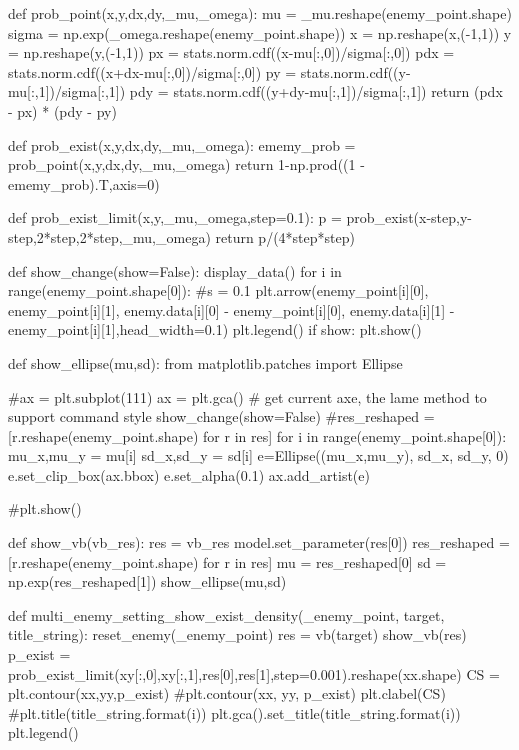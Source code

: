 \documentclass{article}
\begin{document}
\begin{python}

def prob_point(x,y,dx,dy,_mu,_omega):
    mu = _mu.reshape(enemy_point.shape)
    sigma = np.exp(_omega.reshape(enemy_point.shape))
    x = np.reshape(x,(-1,1))
    y = np.reshape(y,(-1,1))
    px  = stats.norm.cdf((x-mu[:,0])/sigma[:,0])
    pdx = stats.norm.cdf((x+dx-mu[:,0])/sigma[:,0])
    py  = stats.norm.cdf((y-mu[:,1])/sigma[:,1])
    pdy = stats.norm.cdf((y+dy-mu[:,1])/sigma[:,1])
    return (pdx - px) * (pdy - py)

def prob_exist(x,y,dx,dy,_mu,_omega):
    ememy_prob = prob_point(x,y,dx,dy,_mu,_omega)
    return 1-np.prod((1 - ememy_prob).T,axis=0) 

def prob_exist_limit(x,y,_mu,_omega,step=0.1):
    p = prob_exist(x-step,y-step,2*step,2*step,_mu,_omega)
    return p/(4*step*step)

def show_change(show=False):
    display_data()
    for i in range(enemy_point.shape[0]):
        #s = 0.1
        plt.arrow(enemy_point[i][0], enemy_point[i][1], enemy.data[i][0] - enemy_point[i][0], enemy.data[i][1] - enemy_point[i][1],head_width=0.1)
    plt.legend()
    if show:
        plt.show()


def show_ellipse(mu,sd):
    from matplotlib.patches import Ellipse
    
    #ax = plt.subplot(111)
    ax = plt.gca() # get current axe, the lame method to support command style
    show_change(show=False)
    #res_reshaped = [r.reshape(enemy_point.shape) for r in res]
    for i in range(enemy_point.shape[0]):
        mu_x,mu_y = mu[i]
        sd_x,sd_y = sd[i]
        e=Ellipse((mu_x,mu_y), sd_x, sd_y, 0)
        e.set_clip_box(ax.bbox)
        e.set_alpha(0.1)
        ax.add_artist(e)
        
    #plt.show()
    
    
def show_vb(vb_res):
    res = vb_res
    model.set_parameter(res[0])
    res_reshaped = [r.reshape(enemy_point.shape) for r in res]
    mu = res_reshaped[0]
    sd = np.exp(res_reshaped[1])
    show_ellipse(mu,sd)
    
def multi_enemy_setting_show_exist_density(_enemy_point, target, title_string):
    reset_enemy(_enemy_point)
    res = vb(target)
    show_vb(res)
    p_exist = prob_exist_limit(xy[:,0],xy[:,1],res[0],res[1],step=0.001).reshape(xx.shape)
    CS = plt.contour(xx,yy,p_exist)
    #plt.contour(xx, yy, p_exist)
    plt.clabel(CS)
    #plt.title(title_string.format(i))
    plt.gca().set_title(title_string.format(i))
    plt.legend()


\end{python}
\end{document}
